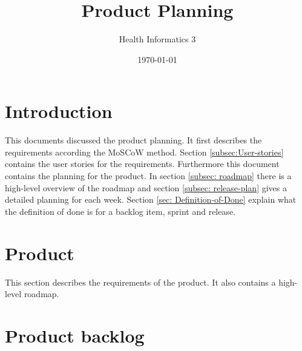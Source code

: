 \documentclass[a4paper]{article}
\title{Product Planning}
\author{Health Informatics 3}
\date{\today}
\begin{document}
\maketitle

\section{Introduction}
This documents discussed the product planning. It first describes the requirements according the MoSCoW method. Section \ref{subsec:User-stories} contains the user stories for the requirements. Furthermore this document contains the planning for the product. In section \ref{subsec: roadmap} there is a high-level overview of the roadmap and section \ref{subsec: release-plan} gives a detailed planning for each week. Section \ref{sec: Definition-of-Done} explain what the definition of done is for a backlog item, sprint and release. 
\section{Product}
This section describes the requirements of the product. It also contains a high-level roadmap.


\section{Product backlog}



\end{document}
